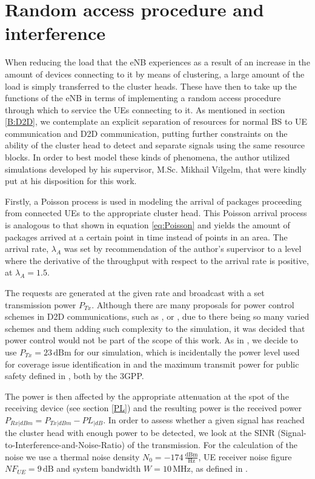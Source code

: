 \section{Random access procedure and interference} \label{RAP}
When reducing the load that the eNB experiences as a result of an increase in the amount of devices connecting to it by means of clustering, a large amount of the load is simply transferred to the cluster heads. These have then to take up the functions of the eNB in terms of implementing a random access procedure through which to service the UEs connecting to it. As mentioned in section \ref{B:D2D}, we contemplate an explicit separation of resources for normal BS to UE communication and D2D communication, putting further constraints on the ability of the cluster head to detect and separate signals using the same resource blocks. In order to best model these kinds of phenomena, the author utilized simulations developed by his supervisor, M.Sc. Mikhail Vilgelm, that were kindly put at his disposition for this work.

Firstly, a Poisson process is used in modeling the arrival of packages proceeding from connected UEs to the appropriate cluster head. This Poisson arrival process is analogous to that shown in equation \ref{eq:Poisson} and yields the amount of packages arrived at a certain point in time instead of points in an area. The arrival rate, $\lambda_A$ was set by recommendation of the author's supervisor to a level where the derivative of the throughput with respect to the arrival rate is positive, at $\lambda_A = 1.5$.

The requests are generated at the given rate and broadcast with a set transmission power $P_{Tx}$. Although there are many proposals for power control schemes in D2D communications, such as \cite{Erturk2013}, \cite{Wei2012} or \cite{Lee}, due to there being so many varied schemes and them adding such complexity to the simulation, it was decided that power control would not be part of the scope of this work. As in \cite{Klugel2014a}, we decide to use $P_{Tx} = 23\,\text{dBm}$ for our simulation, which is incidentally the power level used for coverage issue identification in \cite{3rdGenerationPartnershipProject;2012} and the maximum transmit power for public safety defined in \cite{3rdGenerationPartnershipProject;}, both by the 3GPP.

The power is then affected by the appropriate attenuation at the spot of the receiving device (see section \ref{PL}) and the resulting power is the received power $P_{Rx|dBm} = P_{Tx|dBm} - PL_{|dB}$. In order to assess whether a given signal has reached the cluster head with enough power to be detected, we look at the SINR (Signal-to-Interference-and-Noise-Ratio) of the transmission. For the calculation of the noise we use a thermal noise density $N_0 = -174\,\frac{\text{dBm}}{\text{Hz}}$, UE receiver noise figure $NF_{UE} = 9\,\text{dB}$ and system bandwidth $W = 10\,\text{MHz}$, as defined in \cite{3rdGenerationPartnershipProject;2012}. 

